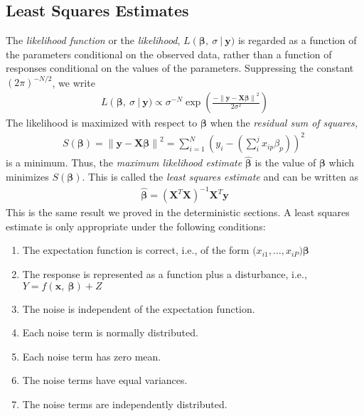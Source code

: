 \documentclass[11pt,a4paper]{article}
\begin{document}
\subsection{Least Squares Estimates}\label{least-squares-estimates}
The \emph{likelihood function} or the \emph{likelihood},
\(L\left( \boldsymbol{\beta},\ \sigma\  \right|\boldsymbol{\ y})\) is regarded
as a function of the parameters conditional on the observed data, rather
than a function of responses conditional on the values of the
parameters. Suppressing the constant \((2\pi)^{- N/2}\), we write
\begin{align}
L\left( \boldsymbol{\beta},\ \sigma\  \right|\boldsymbol{\ y}) \propto \sigma^{- N}\exp\left( \frac{- \left\| \boldsymbol{y} - \boldsymbol{X\beta} \right\|^{2}}{2\sigma^{2}} \right)
\end{align}
The likelihood is maximized with respect to \(\boldsymbol{\beta}\) when the
\emph{residual sum of squares,}
\begin{align}
S\left( \boldsymbol{\beta} \right) = \left\| \boldsymbol{y} - \boldsymbol{X\beta} \right\|^{2} = \sum_{i = 1}^{N}\left( y_{i} - \left( \sum_{i}^{j}{x_{ip}\beta_{p}} \right) \right)^{2}\ 
\end{align}
is a minimum. Thus, the \emph{maximum likelihood estimate}
\(\widehat{\boldsymbol{\beta}}\) is the value of \(\boldsymbol{\beta}\) which
minimizes \(S\left( \boldsymbol{\beta} \right)\). This is called the
\emph{least squares estimate} and can be written as
\begin{align}
\widehat{\boldsymbol{\beta}} = \left( \boldsymbol{X}^{T}\boldsymbol{X} \right)^{- 1}\boldsymbol{X}^{T}\boldsymbol{y}
\end{align}
This is the same result we proved in the deterministic sections.
A least squares estimate is only appropriate under the following
conditions:
\begin{enumerate}
\def\labelenumi{\arabic{enumi}.}
\item
  The expectation function is correct, i.e., of the form
  \((x_{i1}\boldsymbol{,\ldots,}x_{iP}\boldsymbol{)\beta}\)
\item
  The response is represented as a function plus a disturbance, i.e.,
  \(Y = f\left( \boldsymbol{x},\ \boldsymbol{\beta} \right) + Z\)
\item
  The noise is independent of the expectation function.
\item
  Each noise term is normally distributed.
\item
  Each noise term has zero mean.
\item
  The noise terms have equal variances.
\item
  The noise terms are independently distributed.
\end{enumerate}
\end{document}
